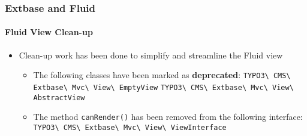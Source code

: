 %

\begin{frame}[fragile]
	\frametitle{Extbase and Fluid}
	\framesubtitle{Fluid View Clean-up}


	\begin{itemize}
		\item Clean-up work has been done to simplify and streamline the Fluid view
			\begin{itemize}
				\item The following classes have been marked as \textbf{deprecated}:\newline
					\small\texttt{TYPO3\textbackslash
						CMS\textbackslash
						Extbase\textbackslash
						Mvc\textbackslash
						View\textbackslash
						EmptyView}\normalsize\newline
					\small\texttt{TYPO3\textbackslash
						CMS\textbackslash
						Extbase\textbackslash
						Mvc\textbackslash
						View\textbackslash
						AbstractView}\normalsize
			\end{itemize}

			\begin{itemize}
				\item The method \texttt{canRender()} has been removed from the following interface:\newline
					\small\texttt{TYPO3\textbackslash
						CMS\textbackslash
						Extbase\textbackslash
						Mvc\textbackslash
						View\textbackslash
						ViewInterface}\normalsize
			\end{itemize}

	\end{itemize}

\end{frame}

